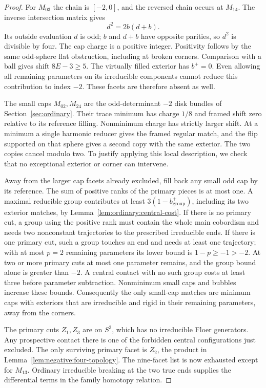 \begin{proof}
For $M_{03}$ the chain is $[-2,0]$, and the reversed chain occurs at
$M_{14}$.  The inverse intersection matrix gives
\[
 d^2=2b(d+b).
\]
Its outside evaluation $d$ is odd; $b$ and $d+b$ have opposite
parities, so $d^2$ is divisible by four.  The cap charge is a positive
integer.  Positivity follows by the same odd-sphere flat obstruction,
including at broken corners.  Comparison with a ball gives shift
$8E-3\ge5$.  The virtually filled exterior has $b^+=0$.
Even allowing all remaining parameters on its irreducible components
cannot reduce this contribution to index $-2$.  These facets are
therefore absent as well.

The small caps $M_{02},M_{24}$ are the odd-determinant $-2$ disk
bundles of Section~\ref{sec:ordinary}.  Their trace minimum has charge
$1/8$ and framed shift zero relative to its reference filling.
Nonminimum charge has strictly larger shift.  At a minimum a single
harmonic reducer gives the framed regular match, and the flip supported
on that sphere gives a second copy with the same exterior.  The two
copies cancel modulo two.  To justify applying this local description,
we check that no exceptional exterior or corner can intervene.

Away from the larger cap facets already excluded, fill back any small
odd cap by its reference.  The sum of positive ranks of the primary
pieces is at most one.  A maximal reducible group contributes at least
$3(1-b^+_{\mathrm{group}})$, including its two exterior matches, by
Lemma~\ref{lem:ordinary:central-cost}.  If there is no primary cut,
a group using the positive rank must contain the whole main cobordism
and needs two nonconstant trajectories to the prescribed irreducible
ends.  If there is one primary cut, such a group touches an end and
needs at least one trajectory; with at most $p=2$ remaining parameters
its lower bound is $1-p\ge-1>-2$.  At two or more primary cuts at most
one parameter remains, and the group bound alone is greater than
$-2$.  A central contact with no such group costs at least three
before parameter subtraction.  Nonminimum small caps and bubbles
increase these bounds.  Consequently the only small-cap matches are
minimum caps with exteriors that are irreducible and rigid in their
remaining parameters, away from the corners.

The primary cuts $Z_1,Z_3$ are on $S^3$, which has no irreducible
Floer generators.  Any prospective contact there is one of the
forbidden central configurations just excluded.  The only surviving
primary facet is $Z_2$, the product in
Lemma~\ref{lem:negative:four-topology}.  The nine-facet list is now
exhausted except for $M_{13}$.  Ordinary irreducible breaking at the
two true ends supplies the differential terms in the family homotopy
relation.
\end{proof}

